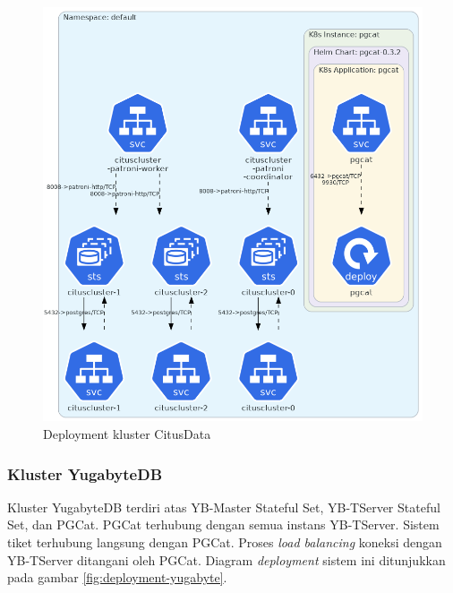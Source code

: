 \begin{figure}[htbp]
    \centering
    \includegraphics[width=1\textwidth]{resources/chapter-4/citusdata.png}
    \caption{Deployment kluster CitusData}
    \label{fig:deployment-citusdata}
\end{figure}

\pagebreak

\subsubsection{Kluster YugabyteDB}

Kluster YugabyteDB terdiri atas YB-Master Stateful Set, YB-TServer Stateful Set, dan PGCat. PGCat terhubung dengan semua instans YB-TServer. Sistem tiket terhubung langsung dengan PGCat. Proses \textit{load balancing} koneksi dengan YB-TServer ditangani oleh PGCat. Diagram \textit{deployment} sistem ini ditunjukkan pada gambar \ref{fig:deployment-yugabyte}.

